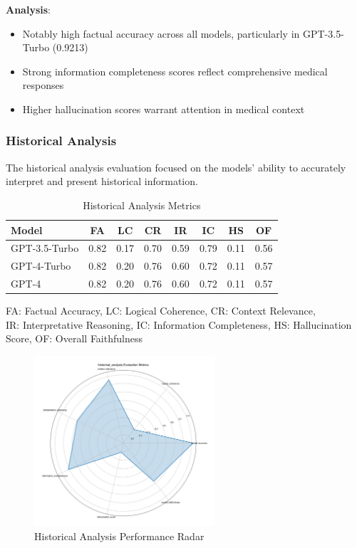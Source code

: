 \textbf{Analysis}:
\begin{itemize}
    \item Notably high factual accuracy across all models, particularly in GPT-3.5-Turbo (0.9213)
    \item Strong information completeness scores reflect comprehensive medical responses
    \item Higher hallucination scores warrant attention in medical context
\end{itemize}

\subsubsection{Historical Analysis}
The historical analysis evaluation focused on the models' ability to accurately interpret and present historical information.

\begin{table}[!htbp]
\centering
\setlength{\tabcolsep}{4pt}  %
\begin{tabular}{|l|c|c|c|c|c|c|c|}
\hline
\textbf{Model} & \textbf{FA} & \textbf{LC} & \textbf{CR} & \textbf{IR} 
& \textbf{IC} & \textbf{HS} & \textbf{OF} \\
\hline
GPT-3.5-Turbo & 0.82 & 0.17 & 0.70 & 0.59 & 0.79 & 0.11 & 0.56 \\
GPT-4-Turbo & 0.82 & 0.20 & 0.76 & 0.60 & 0.72 & 0.11 & 0.57 \\
GPT-4 & 0.82 & 0.20 & 0.76 & 0.60 & 0.72 & 0.11 & 0.57 \\
\hline
\end{tabular}
\caption{Historical Analysis Metrics}
\label{tab:results_historical_metrics}
\begin{flushleft}
\small
FA: Factual Accuracy, LC: Logical Coherence, CR: Context Relevance,\\
IR: Interpretative Reasoning, IC: Information Completeness, HS: Hallucination Score, OF: Overall Faithfulness
\end{flushleft}
\end{table}

\begin{figure}[!htbp]
\centering
\includegraphics[width=0.6\textwidth]{figures/types/historical_analysis_radar_gpt-4.png}
\caption{Historical Analysis Performance Radar}
\label{fig:historical_radar}
\end{figure}

